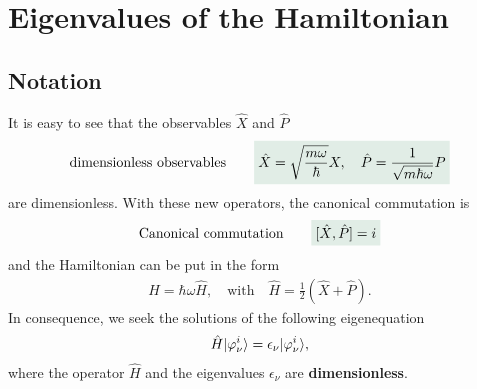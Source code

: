 \section{Eigenvalues of the Hamiltonian}
%
\subsection{Notation}
It is easy to see that the observables $\hat{X}$ and $\hat{P}$ 
\begin{align*}
    \text{dimensionless observables}\qquad\highlight{\hat{X}=\sqrt{\frac{m\omega}{\hbar}}X,\quad\hat{P}=\frac{1}{\sqrt{m\hbar\omega}}P}
\end{align*}
are dimensionless. With these new operators, the canonical commutation is 
\begin{align}
    \text{Canonical commutation}\qquad\highlight{[\hat{X},\hat{P}]=i}
\end{align}
and the Hamiltonian can be put in the form 
\begin{align}
    H=\hbar\omega\hat{H},\quad\text{with}\quad \hat{H}=\frac{1}{2}(\hat{X}+\hat{P}).
\end{align}
In consequence, we seek the solutions of the following eigenequation
\begin{align*}
    \hat{H}|\varphi_\nu^i\rangle=\epsilon_\nu|\varphi_\nu^i\rangle,
\end{align*}
where the operator $\hat{H}$ and the eigenvalues $\epsilon_\nu$ are \textbf{dimensionless}.

